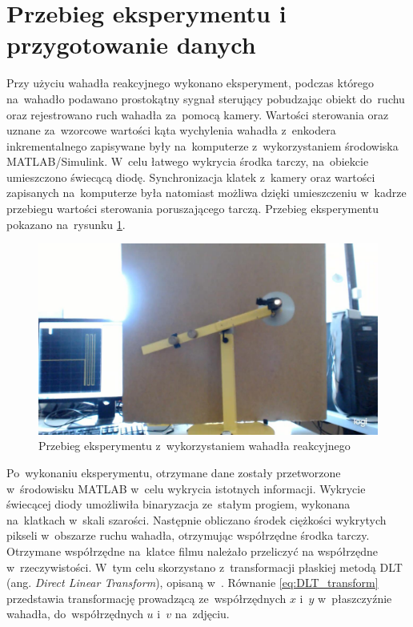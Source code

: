 \section{Przebieg eksperymentu i przygotowanie danych}
\label{sec:pendulum_experiment}
Przy użyciu wahadła reakcyjnego wykonano eksperyment, podczas którego na~wahadło podawano prostokątny sygnał sterujący pobudzając obiekt do~ruchu oraz rejestrowano ruch wahadła za~pomocą kamery. Wartości sterowania oraz uznane za~wzorcowe wartości kąta wychylenia wahadła z~enkodera inkrementalnego zapisywane były na~komputerze z~wykorzystaniem środowiska MATLAB/Simulink. W~celu łatwego wykrycia środka tarczy, na~obiekcie umieszczono świecącą diodę. Synchronizacja klatek z~kamery oraz wartości zapisanych na~komputerze była natomiast możliwa dzięki umieszczeniu w~kadrze przebiegu wartości sterowania poruszającego tarczą. Przebieg eksperymentu pokazano na~rysunku \ref{fig:pendulum_experiment}.
\begin{figure}
	\centering
	\includegraphics[width=0.8\linewidth]{pendulum_experiment.jpg}
	\caption{Przebieg eksperymentu z~wykorzystaniem wahadła reakcyjnego}
	\label{fig:pendulum_experiment}
\end{figure} \par
Po~wykonaniu eksperymentu, otrzymane dane zostały przetworzone w~środowisku MATLAB w~celu wykrycia istotnych informacji. Wykrycie świecącej diody umożliwiła binaryzacja ze~stałym progiem, wykonana na~klatkach w~skali szarości. Następnie obliczano środek ciężkości wykrytych pikseli w~obszarze ruchu wahadła, otrzymując współrzędne środka tarczy. Otrzymane współrzędne na~klatce filmu należało przeliczyć na współrzędne w~rzeczywistości. W~tym celu skorzystano z~transformacji płaskiej metodą DLT (ang. \textit{Direct Linear Transform}), opisaną w~\cite{DLT_description}. Równanie \ref{eq:DLT_transform} przedstawia transformację prowadzącą ze~współrzędnych $x$ i~$y$ w~płaszczyźnie wahadła, do~współrzędnych $u$ i~$v$ na~zdjęciu. 

